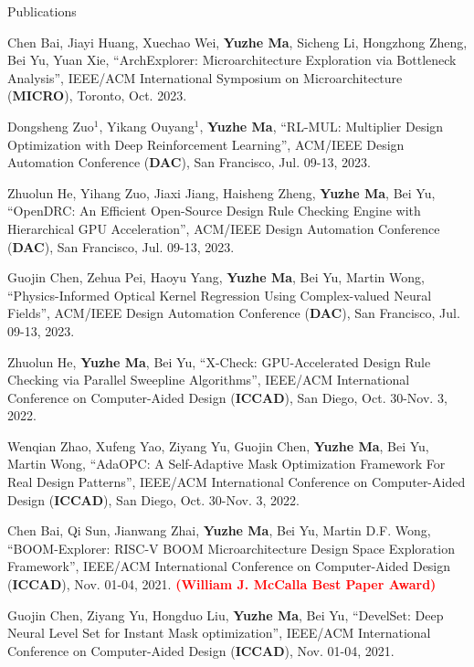 \begin{rSection}{Publications}
\begin{etaremune}
\item {
    Chen Bai, Jiayi Huang, Xuechao Wei, \textbf{Yuzhe Ma}, Sicheng Li, Hongzhong Zheng, Bei Yu, Yuan Xie,
    ``ArchExplorer: Microarchitecture Exploration via Bottleneck Analysis'', 
    IEEE/ACM International Symposium on Microarchitecture (\textbf{MICRO}), Toronto, Oct. 2023.
}

\item {
    Dongsheng Zuo$^1$, Yikang Ouyang$^1$, \textbf{Yuzhe Ma},
    ``RL-MUL: Multiplier Design Optimization with Deep Reinforcement Learning'',
    ACM/IEEE Design Automation Conference (\textbf{DAC}), San Francisco, Jul. 09-13, 2023.
}

\item {
    Zhuolun He, Yihang Zuo, Jiaxi Jiang, Haisheng Zheng, \textbf{Yuzhe Ma}, Bei Yu,
    ``OpenDRC: An Efficient Open-Source Design Rule Checking Engine with Hierarchical GPU Acceleration'',
    ACM/IEEE Design Automation Conference (\textbf{DAC}), San Francisco, Jul. 09-13, 2023.
}

\item {
    Guojin Chen, Zehua Pei, Haoyu Yang, \textbf{Yuzhe Ma}, Bei Yu, Martin Wong,
    ``Physics-Informed Optical Kernel Regression Using Complex-valued Neural Fields'',
    ACM/IEEE Design Automation Conference (\textbf{DAC}), San Francisco, Jul. 09-13, 2023.
}

\item {
    Zhuolun He, \textbf{Yuzhe Ma}, Bei Yu,
    ``X-Check: GPU-Accelerated Design Rule Checking via Parallel Sweepline Algorithms'',
    IEEE/ACM International Conference on Computer-Aided Design (\textbf{ICCAD}), San Diego, Oct. 30-Nov. 3, 2022.
}

\item {
    Wenqian Zhao, Xufeng Yao, Ziyang Yu, Guojin Chen, \textbf{Yuzhe Ma}, Bei Yu, Martin Wong,
    ``AdaOPC: A Self-Adaptive Mask Optimization Framework For Real Design Patterns'',
    IEEE/ACM International Conference on Computer-Aided Design (\textbf{ICCAD}), San Diego, Oct. 30-Nov. 3, 2022.
}

\item {
    Chen Bai, Qi Sun, Jianwang Zhai, \textbf{Yuzhe Ma}, Bei Yu, Martin D.F. Wong,
    ``BOOM-Explorer: RISC-V BOOM Microarchitecture Design Space Exploration Framework'',
    IEEE/ACM International Conference on Computer-Aided Design (\textbf{ICCAD}), Nov. 01-04, 2021.
    \textcolor{red}{\textbf{(William J. McCalla Best Paper Award)}}
}


\item {
    Guojin Chen, Ziyang Yu, Hongduo Liu, \textbf{Yuzhe Ma}, Bei Yu,
    ``DevelSet: Deep Neural Level Set for Instant Mask optimization'',
    IEEE/ACM International Conference on Computer-Aided Design (\textbf{ICCAD}), Nov. 01-04, 2021.
}


\end{etaremune}
\end{rSection}
